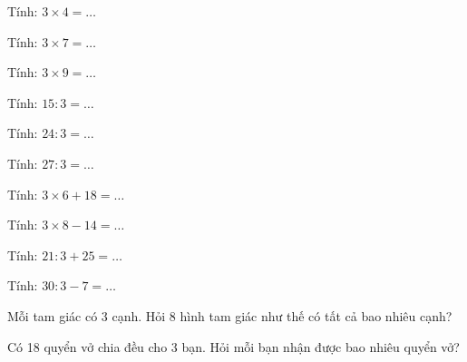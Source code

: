 \begin{ex}
Tính: $3 \times 4 = \dots$
\end{ex}

\begin{ex}
Tính: $3 \times 7 = \dots$
\end{ex}

\begin{ex}
Tính: $3 \times 9 = \dots$
\end{ex}

\begin{ex}
Tính: $15 : 3 = \dots$
\end{ex}

\begin{ex}
Tính: $24 : 3 = \dots$
\end{ex}

\begin{ex}
Tính: $27 : 3 = \dots$
\end{ex}

\begin{ex}
Tính: $3 \times 6 + 18 = \dots$
\end{ex}

\begin{ex}
Tính: $3 \times 8 - 14 = \dots$
\end{ex}

\begin{ex}
Tính: $21 : 3 + 25 = \dots$
\end{ex}

\begin{ex}
Tính: $30 : 3 - 7 = \dots$
\end{ex}

\begin{ex}
Mỗi tam giác có 3 cạnh. Hỏi 8 hình tam giác như thế có tất cả bao nhiêu cạnh?
\end{ex}

\begin{ex}
Có 18 quyển vở chia đều cho 3 bạn. Hỏi mỗi bạn nhận được bao nhiêu quyển vở?
\end{ex}

